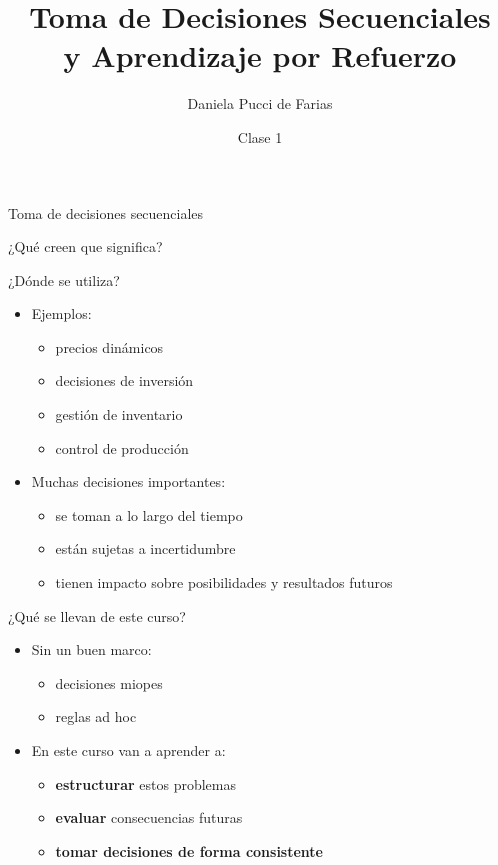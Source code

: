 \documentclass{beamer}
\title{Toma de Decisiones Secuenciales \\ y Aprendizaje por Refuerzo}
\author{Daniela Pucci de Farias}
\institute{Universidad Torcuato Di Tella}
\date{Clase 1}
\begin{document}
\frame{\titlepage}

\begin{frame}{Toma de decisiones secuenciales}
\begin{center}
\Large
¿Qué creen que significa?
\end{center}
\end{frame}

\begin{frame}{¿D\'onde se utiliza?}
\begin{itemize}

\item Ejemplos:
\begin{itemize}
\item precios dinámicos
\item decisiones de inversión
\item gestión de inventario
\item control de producción
\end{itemize}
\item<2-> Muchas decisiones importantes:
\begin{itemize}
\item se toman a lo largo del tiempo
\item est\'an sujetas a incertidumbre
\item tienen impacto sobre posibilidades y resultados futuros
\end{itemize}

\end{itemize}
\end{frame}

\begin{frame}{¿Qué se llevan de este curso?}
\begin{itemize}
\item Sin un buen marco:
\begin{itemize}
\item decisiones miopes
\item reglas ad hoc
\end{itemize}

\item<2-> En este curso van a aprender a:
\begin{itemize}
\item \textbf{estructurar} estos problemas
\item \textbf{evaluar} consecuencias futuras
\item \textbf{tomar decisiones de forma consistente}
\end{itemize}
\end{itemize}
\end{frame}
\end{document}
